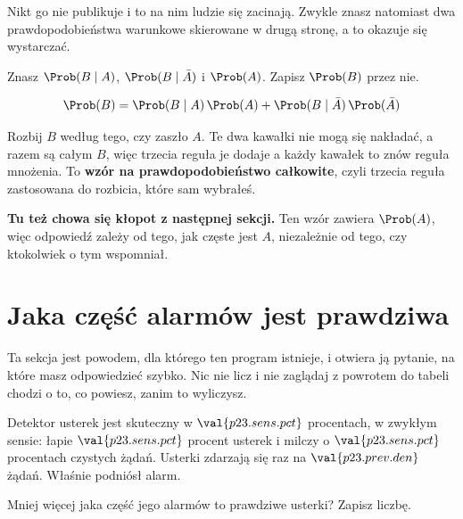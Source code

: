 \begin{fr}

Nikt go nie publikuje i to na nim ludzie się zacinają. Zwykle znasz natomiast
dwa prawdopodobieństwa warunkowe skierowane w drugą stronę, a to okazuje się
wystarczać.

Znasz $\Prob(B \mid A)$, $\Prob(B \mid \bar{A})$ i $\Prob(A)$. Zapisz
$\Prob(B)$ przez nie.
\dotline
\nextframe
\end{fr}

\begin{fr}
\begin{ansblock}
\[ \Prob(B) = \Prob(B \mid A)\,\Prob(A)
            + \Prob(B \mid \bar{A})\,\Prob(\bar{A}) \]
\end{ansblock}

Rozbij $B$ według tego, czy zaszło $A$. Te dwa kawałki nie mogą się nakładać, a
razem są całym $B$, więc trzecia reguła je dodaje \dash{} a każdy kawałek to
znów reguła mnożenia. To \textbf{wzór na prawdopodobieństwo całkowite}, czyli
trzecia reguła zastosowana do rozbicia, które sam wybrałeś.

\textbf{Tu też chowa się kłopot z następnej sekcji.} Ten wzór zawiera
$\Prob(A)$, więc odpowiedź zależy od tego, jak częste jest $A$, niezależnie od
tego, czy ktokolwiek o tym wspomniał.
\end{fr}

\section{Jaka część alarmów jest prawdziwa}
\label{sec:P23-baserate}

\begin{fr}
Ta sekcja jest powodem, dla którego ten program istnieje, i otwiera ją
pytanie, na które masz odpowiedzieć szybko. Nic nie licz i nie zaglądaj z
powrotem do tabeli \dash{} chodzi o to, co powiesz, zanim to wyliczysz.

Detektor usterek jest skuteczny w $\val{p23.sens.pct}$ procentach, w zwykłym
sensie: łapie $\val{p23.sens.pct}$ procent usterek i milczy o
$\val{p23.sens.pct}$ procentach czystych żądań. Usterki zdarzają się raz na
$\val{p23.prev.den}$ żądań. Właśnie podniósł alarm.

Mniej więcej jaka część jego alarmów to prawdziwe usterki? Zapisz liczbę.
\dotline
\nextframe
\end{fr}

